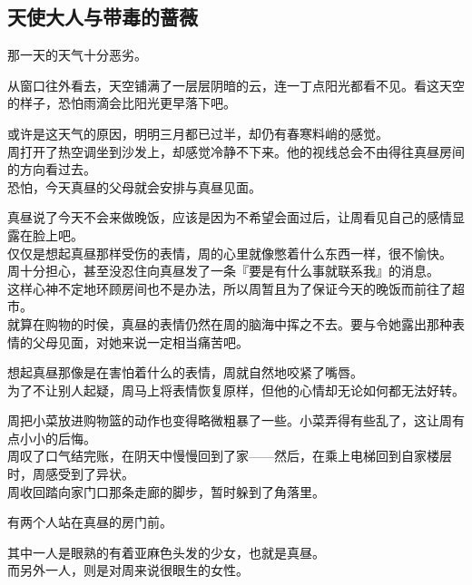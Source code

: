 \subsection{天使大人与带毒的蔷薇}

那一天的天气十分恶劣。

从窗口往外看去，天空铺满了一层层阴暗的云，连一丁点阳光都看不见。看这天空的样子，恐怕雨滴会比阳光更早落下吧。

或许是这天气的原因，明明三月都已过半，却仍有春寒料峭的感觉。\\

周打开了热空调坐到沙发上，却感觉冷静不下来。他的视线总会不由得往真昼房间的方向看过去。\\

恐怕，今天真昼的父母就会安排与真昼见面。

真昼说了今天不会来做晚饭，应该是因为不希望会面过后，让周看见自己的感情显露在脸上吧。\\

仅仅是想起真昼那样受伤的表情，周的心里就像憋着什么东西一样，很不愉快。\\

周十分担心，甚至没忍住向真昼发了一条『要是有什么事就联系我』的消息。\\

这样心神不定地环顾房间也不是办法，所以周暂且为了保证今天的晚饭而前往了超市。\\

就算在购物的时侯，真昼的表情仍然在周的脑海中挥之不去。要与令她露出那种表情的父母见面，对她来说一定相当痛苦吧。

想起真昼那像是在害怕着什么的表情，周就自然地咬紧了嘴唇。\\

为了不让别人起疑，周马上将表情恢复原样，但他的心情却无论如何都无法好转。

周把小菜放进购物篮的动作也变得略微粗暴了一些。小菜弄得有些乱了，这让周有点小小的后悔。\\

周叹了口气结完账，在阴天中慢慢回到了家——然后，在乘上电梯回到自家楼层时，周感受到了异状。\\

周收回踏向家门口那条走廊的脚步，暂时躲到了角落里。

有两个人站在真昼的房门前。

其中一人是眼熟的有着亚麻色头发的少女，也就是真昼。\\

而另外一人，则是对周来说很眼生的女性。

